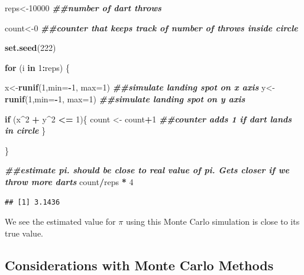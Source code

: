 \documentclass[
]{book}
\newenvironment{Shaded}{\begin{snugshade}}{\end{snugshade}}
\newcommand{\AttributeTok}[1]{\textcolor[rgb]{0.13,0.29,0.53}{#1}}
\newcommand{\ControlFlowTok}[1]{\textcolor[rgb]{0.13,0.29,0.53}{\textbf{#1}}}
\newcommand{\DecValTok}[1]{\textcolor[rgb]{0.00,0.00,0.81}{#1}}
\newcommand{\DocumentationTok}[1]{\textcolor[rgb]{0.56,0.35,0.01}{\textbf{\textit{#1}}}}
\newcommand{\FunctionTok}[1]{\textcolor[rgb]{0.13,0.29,0.53}{\textbf{#1}}}
\newcommand{\NormalTok}[1]{#1}
\newcommand{\OtherTok}[1]{\textcolor[rgb]{0.56,0.35,0.01}{#1}}
\newcommand{\SpecialCharTok}[1]{\textcolor[rgb]{0.81,0.36,0.00}{\textbf{#1}}}
\begin{document}
\begin{Shaded}
\begin{Highlighting}[]
\NormalTok{reps}\OtherTok{\textless{}{-}}\DecValTok{10000} \DocumentationTok{\#\#number of dart throws}

\NormalTok{count}\OtherTok{\textless{}{-}}\DecValTok{0} \DocumentationTok{\#\#counter that keeps track of number of throws inside circle}

\FunctionTok{set.seed}\NormalTok{(}\DecValTok{222}\NormalTok{)}

\ControlFlowTok{for}\NormalTok{ (i }\ControlFlowTok{in} \DecValTok{1}\SpecialCharTok{:}\NormalTok{reps) \{}

\NormalTok{x}\OtherTok{\textless{}{-}}\FunctionTok{runif}\NormalTok{(}\DecValTok{1}\NormalTok{,}\AttributeTok{min=}\SpecialCharTok{{-}}\DecValTok{1}\NormalTok{, }\AttributeTok{max=}\DecValTok{1}\NormalTok{) }\DocumentationTok{\#\#simulate landing spot on x axis}
\NormalTok{y}\OtherTok{\textless{}{-}}\FunctionTok{runif}\NormalTok{(}\DecValTok{1}\NormalTok{,}\AttributeTok{min=}\SpecialCharTok{{-}}\DecValTok{1}\NormalTok{, }\AttributeTok{max=}\DecValTok{1}\NormalTok{) }\DocumentationTok{\#\#simulate landing spot on y axis}

  \ControlFlowTok{if}\NormalTok{ (x}\SpecialCharTok{\^{}}\DecValTok{2} \SpecialCharTok{+}\NormalTok{ y}\SpecialCharTok{\^{}}\DecValTok{2} \SpecialCharTok{\textless{}=} \DecValTok{1}\NormalTok{)\{}
\NormalTok{    count }\OtherTok{\textless{}{-}}\NormalTok{ count}\SpecialCharTok{+}\DecValTok{1} \DocumentationTok{\#\#counter adds 1 if dart lands in circle}
\NormalTok{  \}}

\NormalTok{\}}

\DocumentationTok{\#\#estimate pi. should be close to real value of pi. Gets closer if we throw more darts}
\NormalTok{count}\SpecialCharTok{/}\NormalTok{reps }\SpecialCharTok{*} \DecValTok{4} 
\end{Highlighting}
\end{Shaded}

\begin{verbatim}
## [1] 3.1436
\end{verbatim}

We see the estimated value for \(\pi\) using this Monte Carlo simulation is close to its true value.

\subsection{Considerations with Monte Carlo Methods}\label{considerations-with-monte-carlo-methods}
\end{document}
